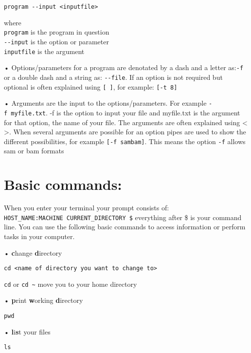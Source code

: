 \documentclass[
]{book}
\begin{document}
\begin{verbatim}
program --input <inputfile>
\end{verbatim}

where\\
\texttt{program} is the program in question\\
\texttt{-\/-input} is the option or parameter\\
\texttt{inputfile} is the argument

• Options/parameters for a program are denotated by a dash and a letter as:\texttt{-f} or a double dash and a string as: \texttt{-\/-file}. If an option is not required but optional is often explained using \texttt{{[}\ {]}}, for example: \texttt{{[}-t\ 8{]}}

• Arguments are the input to the options/parameters. For example \texttt{-f\ myfile.txt}. -f is the option to input your file and myfile.txt is the argument for that option, the name of your file. The arguments are often explained using \textless{} \textgreater. When several arguments are possible for an option pipes are used to show the different possibilities, for example \texttt{{[}-f\ sam\textbar{}bam{]}}. This means the option \texttt{-f} allows sam or bam formats

\hypertarget{basic-commands}{%
\section{Basic commands:}\label{basic-commands}}

When you enter your terminal your prompt consists of: \texttt{HOST\_NAME:MACHINE\ CURRENT\_DIRECTORY\ \$} everything after \$ is your command line. You can use the following basic commands to access information or perform tasks in your computer.

• \textbf{c}hange \textbf{d}irectory

\begin{verbatim}
cd <name of directory you want to change to>
\end{verbatim}

\texttt{cd} or \texttt{cd\ \textasciitilde{}} move you to your home directory

• \textbf{p}rint \textbf{w}orking \textbf{d}irectory

\begin{verbatim}
pwd
\end{verbatim}

• \textbf{l}i\textbf{s}t your files

\begin{verbatim}
ls
\end{verbatim}
\end{document}
